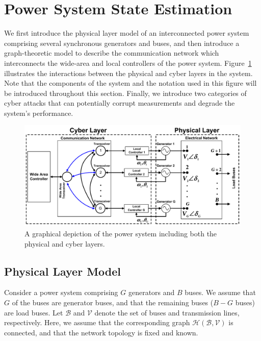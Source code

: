 
\section{Power System State Estimation}\label{sec:application}
We first introduce the physical layer model of an interconnected power system comprising several synchronous generators and buses, and then introduce a graph-theoretic model to describe the communication network which interconnects the wide-area and local controllers of the power system. Figure~\ref{ps} illustrates the interactions between the physical and cyber layers in the system. Note that the components of the system and the notation used
in this figure will be introduced throughout this section. Finally, we introduce two categories of cyber attacks that can potentially corrupt measurements and degrade the system's performance.

\begin{figure}[t]
\begin{center}
\includegraphics[width=\textwidth]{chapters/se_nonlinear/figures/ps}\caption{A graphical depiction of the power system including both the physical and cyber layers.}\label{ps}
\end{center}
\end{figure}



\subsection{Physical Layer Model}
Consider a power system comprising $G$ generators and $B$ buses. We assume that $G$ of the buses are generator buses, and that the remaining buses ($B-G$ buses) are load buses. Let $\mathcal{B}$ and $\mathcal{V}$ denote the set of buses and transmission lines, respectively. Here, we assume that the corresponding graph $\mathcal{H}(\mathcal{B},\mathcal{V})$ is connected, and that the network topology is fixed and known.

